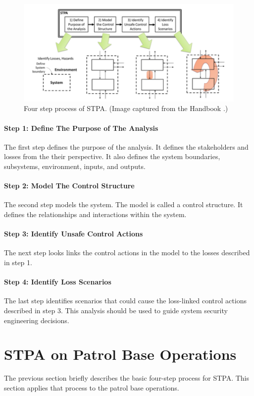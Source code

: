 \documentclass[../../main/main.tex]{subfiles}
\begin{document}
\begin{figure}[h]
\includegraphics[width=\linewidth]{../figures/4step}
\caption{\label{4step} Four step process of STPA. (Image captured from the  Handbook \cite{stpa}.)}
\end{figure}


\paragraph*{Step 1: Define The Purpose of The Analysis}
The first step defines the purpose of the analysis.  It defines the stakeholders and losses from the their perspective.  It also defines the system boundaries, subsystems, environment, inputs, and outputs.  

\paragraph*{Step 2: Model The Control Structure}
The second step models the system.  The model is called a control structure.  It defines the relationships and interactions within the system.

\paragraph*{Step 3: Identify Unsafe Control Actions}
The next step looks links the control actions in the model to the losses described in step 1.

\paragraph*{Step 4: Identify Loss Scenarios}
The last step identifies scenarios that could cause the loss-linked control actions described in step 3.  This analysis should be used to guide system security engineering decisions.


\section{STPA on Patrol Base Operations}
The previous section briefly describes the basic four-step process for STPA.  This section applies that process to the patrol base operations.
\end{document}
